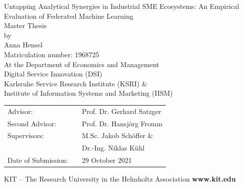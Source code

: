 \begin{titlepage}
\vspace*{1cm}
\begin{center}
		\LARGE{Untapping Analytical Synergies in Industrial SME Ecosystems: An Empirical Evaluation of Federated Machine Learning} %
		\vspace*{1.5cm}\\
		\large{Master Thesis}\\ %
		\large{by}\\ %
		\vspace*{1cm}
		\LARGE{Anna Hensel}\\ %
		\normalsize{Matriculation number: 1968725}\\ %
		\vspace*{1cm}
		\large{ %
			At the Department of Economics and Management
			\\ \vspace*{1cm}
			Digital Service Innovation (DSI)
			\\ \vspace*{0.5cm}
			Karlsruhe Service Research Institute (KSRI) \& \\
			Institute of Information Systems and Marketing (IISM)
		}
	\end{center}
	\vspace*{0.75cm}
\large{ %
\begin{center}
\begin{tabular}[ht]{l c l}
  Advisor: & \hfill  &Prof. Dr. Gerhard Satzger\\
  Second Advisor: & \hfill  &Prof. Dr. Hansjörg Fromm\\
  Supervisors: & \hfill  &M.Sc. Jakob Schöffer \&\\
  \mbox{} & \hfill  &Dr.-Ing. Niklas Kühl\\
  Date of Submission:  & \hfill  & 29 October 2021\\
\end{tabular}
\end{center}
}


\vspace*{1.0cm}
	\tiny{KIT -- The Research University in the Helmholtz Association} \hfill \small{\textbf{www.kit.edu} }
\end{titlepage}
